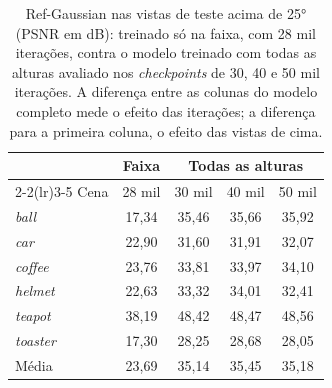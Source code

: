 \begin{table}[t]
\centering
\caption{Ref-Gaussian nas vistas de teste acima de 25° (PSNR em dB): treinado só na faixa, com 28 mil iterações, contra o modelo treinado com todas as alturas avaliado nos \textit{checkpoints} de 30, 40 e 50 mil iterações. A diferença entre as colunas do modelo completo mede o efeito das iterações; a diferença para a primeira coluna, o efeito das vistas de cima.}
\label{tab:refgsiter25}
\setlength{\tabcolsep}{4pt}
\footnotesize
\begin{tabular}{l c ccc}
\toprule
 & Faixa & \multicolumn{3}{c}{Todas as alturas} \\
\cmidrule(lr){2-2}\cmidrule(lr){3-5}
Cena & 28 mil & 30 mil & 40 mil & 50 mil \\
\midrule
\textit{ball} & 17{,}34 & 35{,}46 & 35{,}66 & 35{,}92 \\
\textit{car} & 22{,}90 & 31{,}60 & 31{,}91 & 32{,}07 \\
\textit{coffee} & 23{,}76 & 33{,}81 & 33{,}97 & 34{,}10 \\
\textit{helmet} & 22{,}63 & 33{,}32 & 34{,}01 & 32{,}41 \\
\textit{teapot} & 38{,}19 & 48{,}42 & 48{,}47 & 48{,}56 \\
\textit{toaster} & 17{,}30 & 28{,}25 & 28{,}68 & 28{,}05 \\
\midrule
Média & 23{,}69 & 35{,}14 & 35{,}45 & 35{,}18 \\
\bottomrule
\end{tabular}
\end{table}
